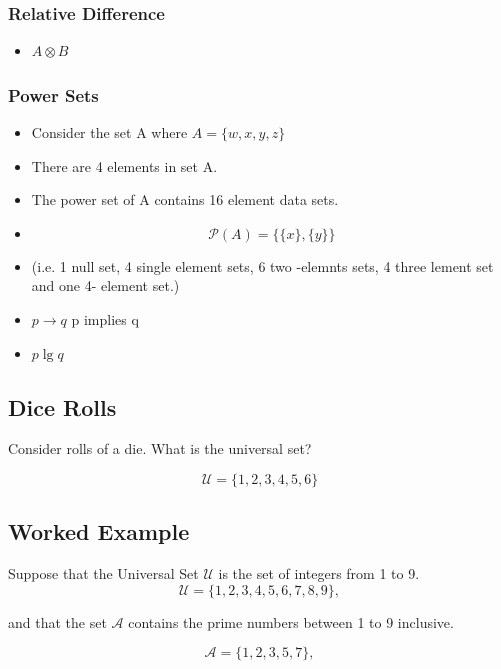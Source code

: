 \documentclass[]{report}
\begin{document}
\subsubsection*{Relative Difference}
\begin{itemize}
	\item $ A \otimes B$
\end{itemize}
\subsubsection*{Power Sets}
\begin{itemize}
	\item Consider the set A where $ A = \{w,x,y,z\}$
	\item There are 4 elements in set A.
	\item The power set of A contains 16 element data sets.
	\item \[  \mathcal{P}(A) = \{\{ x \}, \{ y \} \}  \]
	\item (i.e. 1 null set, 4 single element sets, 6 two -elemnts sets, 4 three lement set and one 4- element set.)
\end{itemize}
\newpage
\begin{itemize}
	\item $ p \rightarrow q$  p implies q
	\item $p \lg q $
\end{itemize}
\subsection*{Dice Rolls}
Consider rolls of a die. What is the universal set?

\[ \mathcal{U} = \{1,2,3,4,5,6\} \]

\subsection*{Worked Example}

Suppose that the Universal Set $\mathcal{U}$ is the set of integers from 1 to 9.
\[ \mathcal{U} = \{1,2,3,4,5,6,7,8,9\}, \]

and that the set $\mathcal{A}$ contains the prime numbers between 1 to 9 inclusive.

\[ \mathcal{A} = \{1,2,3,5,7\}, \]
\end{document}
